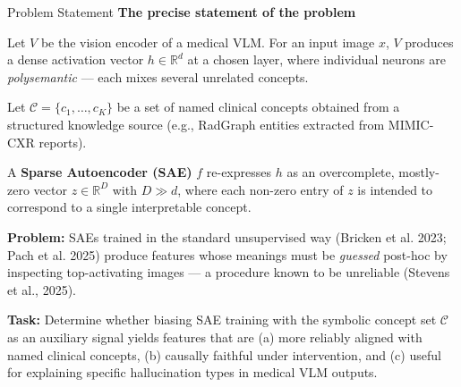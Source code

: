 \documentclass[aspectratio=169,11pt]{beamer}
\begin{document}
\begin{frame}{Problem Statement}
    \textbf{The precise statement of the problem}

    \vspace{0.4em}
    Let $V$ be the vision encoder of a medical VLM. For an input image $x$, $V$ produces a dense activation vector $h \in \mathbb{R}^d$ at a chosen layer, where individual neurons are \emph{polysemantic} --- each mixes several unrelated concepts.

    \vspace{0.4em}
    Let $\mathcal{C} = \{c_1, \dots, c_K\}$ be a set of named clinical concepts obtained from a structured knowledge source (e.g., RadGraph entities extracted from MIMIC-CXR reports).

    \vspace{0.4em}
    A \textbf{Sparse Autoencoder (SAE)} $f$ re-expresses $h$ as an overcomplete, mostly-zero vector $z \in \mathbb{R}^D$ with $D \gg d$, where each non-zero entry of $z$ is intended to correspond to a single interpretable concept.

    \vspace{0.4em}
    \textbf{Problem:} SAEs trained in the standard unsupervised way (Bricken et al. 2023; Pach et al. 2025) produce features whose meanings must be \emph{guessed} post-hoc by inspecting top-activating images --- a procedure known to be unreliable (Stevens et al., 2025).

    \vspace{0.4em}
    \textbf{Task:} Determine whether biasing SAE training with the symbolic concept set $\mathcal{C}$ as an auxiliary signal yields features that are (a) more reliably aligned with named clinical concepts, (b) causally faithful under intervention, and (c) useful for explaining specific hallucination types in medical VLM outputs.
\end{frame}
\end{document}
